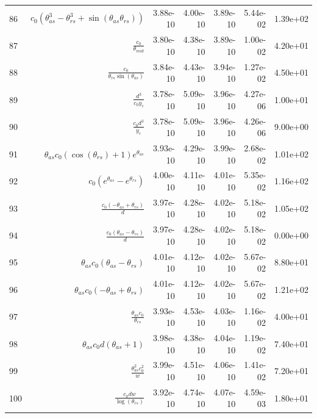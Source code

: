 \begin{tabularx}{\textwidth}{lRRRRRl}
86  &  $ c_{0} \left(\theta_{as}^{3} - \theta_{rs}^{3} + \sin{\left(\theta_{as} \theta_{rs} \right)}\right) $  &  3.88e-10  &  4.00e-10  &  3.89e-10  &  5.44e-02  &  1.39e+02  \\ 
87  &  $ \displaystyle\frac{c_{0}}{\theta_{mid}} $  &  3.80e-10  &  4.38e-10  &  3.89e-10  &  1.00e-02  &  4.20e+01  \\ 
88  &  $ \displaystyle\frac{c_{0}}{\theta_{rs} \sin{\left(\theta_{as} \right)}} $  &  3.84e-10  &  4.43e-10  &  3.94e-10  &  1.27e-02  &  4.50e+01  \\ 
89  &  $ \displaystyle\frac{d^{3}}{c_{0} y_c} $  &  3.78e-10  &  5.09e-10  &  3.96e-10  &  4.27e-06  &  1.00e+01  \\ 
90  &  $ \displaystyle\frac{c_{0} d^{3}}{y_c} $  &  3.78e-10  &  5.09e-10  &  3.96e-10  &  4.26e-06  &  9.00e+00  \\ 
91  &  $ \theta_{as} c_{0} \left(\cos{\left(\theta_{rs} \right)} + 1\right) e^{\theta_{as}} $  &  3.93e-10  &  4.29e-10  &  3.99e-10  &  2.68e-02  &  1.01e+02  \\ 
92  &  $ c_{0} \left(e^{\theta_{as}} - e^{\theta_{rs}}\right) $  &  4.00e-10  &  4.11e-10  &  4.01e-10  &  5.35e-02  &  1.16e+02  \\ 
93  &  $ \displaystyle\frac{c_{0} \left(- \theta_{as} + \theta_{rs}\right)}{d} $  &  3.97e-10  &  4.28e-10  &  4.02e-10  &  5.18e-02  &  1.05e+02  \\ 
94  &  $ \displaystyle\frac{c_{0} \left(\theta_{as} - \theta_{rs}\right)}{d} $  &  3.97e-10  &  4.28e-10  &  4.02e-10  &  5.18e-02  &  0.00e+00  \\ 
95  &  $ \theta_{as} c_{0} \left(\theta_{as} - \theta_{rs}\right) $  &  4.01e-10  &  4.12e-10  &  4.02e-10  &  5.67e-02  &  8.80e+01  \\ 
96  &  $ \theta_{as} c_{0} \left(- \theta_{as} + \theta_{rs}\right) $  &  4.01e-10  &  4.12e-10  &  4.02e-10  &  5.67e-02  &  1.21e+02  \\ 
97  &  $ \displaystyle\frac{\theta_{as} c_{0}}{\theta_{rs}} $  &  3.93e-10  &  4.53e-10  &  4.03e-10  &  1.16e-02  &  4.00e+01  \\ 
98  &  $ \theta_{as} c_{0} d \left(\theta_{as} + 1\right) $  &  3.98e-10  &  4.38e-10  &  4.04e-10  &  1.19e-02  &  7.40e+01  \\ 
99  &  $ \displaystyle\frac{\theta_{as}^{2} c_{0}^{2}}{w} $  &  3.99e-10  &  4.51e-10  &  4.06e-10  &  1.41e-02  &  7.20e+01  \\ 
100  &  $ \displaystyle\frac{c_{0} d w}{\log{\left(\theta_{rs} \right)}} $  &  3.92e-10  &  4.74e-10  &  4.07e-10  &  4.59e-03  &  1.80e+01  \\ 

\end{tabularx}
